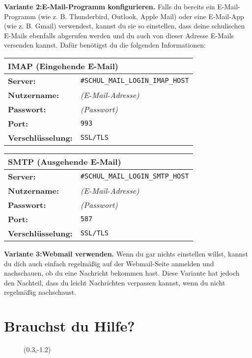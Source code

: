 {\bf Variante 2:\hspace*{3mm}E-Mail-Programm konfigurieren.} Falls du bereits ein E-Mail-Programm (wie z. B. Thunderbird, Outlook, Apple Mail) oder eine E-Mail-App (wie z. B. Gmail) verwendest, kannst du sie so einstellen, dass deine schulischen E-Mails ebenfalls abgerufen werden und du auch von dieser Adresse E-Mails versenden kannst. Dafür benötigst du die folgenden Informationen:

\begin{multicols}{2}
\begin{tabularx}{\columnwidth}{p{3cm}X}
\multicolumn{2}{l}{\bf IMAP (Eingehende E-Mail)} \\
\hline
{\bf Server:} & {\tt #{SCHUL_MAIL_LOGIN_IMAP_HOST}} \\
{\bf Nutzername:} & {\em (E-Mail-Adresse)} \\
{\bf Passwort:} & {\em (Passwort)} \\
{\bf Port:} & {\tt 993} \\
{\bf Verschlüsselung:} & {\tt SSL/TLS} \\
\hline
\end{tabularx}
\begin{tabularx}{\columnwidth}{p{4cm}X}
\multicolumn{2}{l}{\bf SMTP (Ausgehende E-Mail)} \\
\hline
{\bf Server:} & {\tt #{SCHUL_MAIL_LOGIN_SMTP_HOST}} \\
{\bf Nutzername:} & {\em (E-Mail-Adresse)} \\
{\bf Passwort:} & {\em (Passwort)} \\
{\bf Port:} & {\tt 587} \\
{\bf Verschlüsselung:} & {\tt SSL/TLS} \\
\hline
\end{tabularx}
\end{multicols}

{\bf Variante 3:\hspace*{3mm}Webmail verwenden.} Wenn du gar nichts einstellen willst, kannst du dich auch einfach regelmäßig auf der Webmail-Seite anmelden und nachschauen, ob du eine Nachricht bekommen hast. Diese Variante hat jedoch den Nachteil, dass du leicht Nachrichten verpassen kannst, wenn du nicht regelmäßig nachschaust.

\section*{Brauchst du Hilfe?}

\begin{wrapfigure}[2]{r}{3cm}
\begin{textblock}{4}(0.3,-1.2)
\scalebox{0.2}{}
\end{textblock}
\end{wrapfigure}


